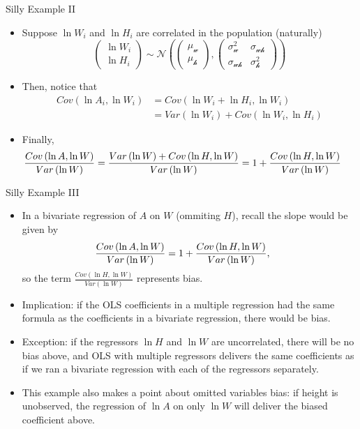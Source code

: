 \documentclass[english,xcolor={dvipsnames},aspectratio=169]{beamer}
\begin{document}
\begin{frame}{Silly Example II}
	\begin{itemize}
	\item Suppose $\ln W_i$ and $\ln H_i$ are correlated in the population (naturally)\[
\left(\begin{array}{c}
\ln W_{i}\\
\ln H_{i}
\end{array}\right)\sim\mathcal{N\left(\left(\begin{array}{c}
\mu_w\\
\mu_h
\end{array}\right),\left(\begin{array}{cc}
\sigma_{w}^{2} & \sigma_{wh}\\
\sigma_{wh} & \sigma_{h}^{2}
\end{array}\right)\right)}
\]
	\smallskip
	\item Then, notice that\[
	\begin{array}{ll}
	Cov\left( \ln A_{i}, \ln W_{i}\right) & = Cov\left(\ln W_{i} + \ln H_{i}, \ln W_{i}\right) \\
	& = Var\left( \ln W_{i}\right) + Cov\left(\ln W_{i}, \ln H_{i}\right) 
	\end{array}
	\]

	\smallskip
	\item Finally, \[
\hspace*{-.5cm}\frac{Cov\left(\ln A,\ln W\right)}{Var\left(\ln W\right)}=\frac{Var\left(\ln W\right)+Cov\left(\ln H,\ln W\right)}{Var\left(\ln W\right)}=1+\frac{Cov\left(\ln H,\ln W\right)}{Var\left(\ln W\right)}
\]
\end{itemize}
\end{frame}


\begin{frame}{Silly Example III}
	\begin{itemize}
	\item In a bivariate regression of $A$ on $W$ (ommiting $H$), recall the slope would be given by \[
	\hspace*{-.5cm}\frac{Cov\left(\ln A,\ln W\right)}{Var\left(\ln W\right)}=1+\frac{Cov\left(\ln H,\ln W\right)}{Var\left(\ln W\right)},
	\]
	so the term $\frac{Cov\left(\ln H,\ln W\right)}{Var\left(\ln W\right)}$ represents bias. 

	\smallskip
	\item Implication: if the OLS coefficients in a multiple regression had the same formula 
	as the coefficients in a bivariate regression, there would be bias. 

	\smallskip
	\item Exception: if the regressors $\ln H$ and $\ln W$ are uncorrelated, there will be no bias above, and
	OLS with multiple regressors delivers the same coefficients as if we ran a bivariate regression with each
	of the regressors separately. 

	\smallskip
	\item This example also makes a point about omitted variables bias: if height is unobserved, the regression
	of $\ln A$ on only $\ln W$ will deliver the biased coefficient above.
	
\end{itemize}
\end{frame}
\end{document}
